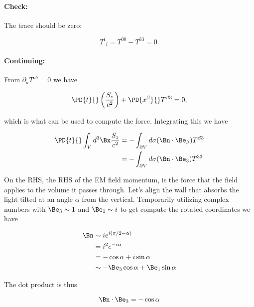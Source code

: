 \paragraph{Check:} The trace should be zero:

\begin{equation}\label{eqn:relativisticElectrodynamicsPS6P1:n}
{T^i}_i = T^{0 0} - T^{3 3} = 0.
\end{equation}

\paragraph{Continuing:}

From $\partial_a T^{a b} = 0$ we have

\begin{equation}\label{eqn:relativisticElectrodynamicsPS6P1:n}
\PD{t}{} \left( \frac{S_z}{c^2} \right) + \PD{x^\beta}{} T^{\beta 3} = 0,
\end{equation}

which is what can be used to compute the force.  Integrating this we have

\begin{align*}
\PD{t}{} \int_V d^3 \Bx \frac{S_z}{c^2} 
&= - \int_{\partial V} d\sigma (\Bn \cdot \Be_\beta) T^{\beta 3} \\
&= - \int_{\partial V} d\sigma (\Bn \cdot \Be_3) T^{3 3} 
\end{align*}

On the RHS, the RHS of the EM field momentum, is the force that the field applies to the volume it passes through.  Let's align the wall that absorbs the light tilted at an angle $\alpha$ from the vertical.  Temporarily utilizing complex numbers with $\Be_3 \sim 1$ and $\Be_1 \sim i$ to get compute the rotated coordinates we have

\begin{align*}
\Bn 
&\sim i e^{i (\pi/2 - \alpha)} \\
&= i^2 e^{-i \alpha} \\
&= -\cos\alpha + i \sin\alpha \\
&\sim
-\Be_3 \cos\alpha + \Be_1 \sin\alpha
\end{align*}

The dot product is thus

\begin{equation}\label{eqn:relativisticElectrodynamicsPS6P1:n}
\Bn \cdot \Be_3 = -\cos\alpha
\end{equation}

